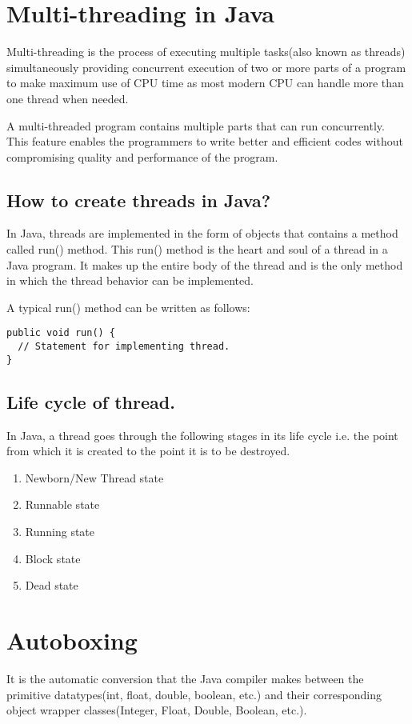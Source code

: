 \documentclass[a4paper, 12pt]{scrarticle}
\begin{document}
\section{Multi-threading in Java}
Multi-threading is the process of  executing multiple tasks(also known as threads) simultaneously providing concurrent execution of two or more parts of a program to make maximum use of CPU time as most modern CPU can handle more than one thread when needed.

A multi-threaded program contains multiple parts that can run concurrently. This feature enables the  programmers to write better and efficient codes without compromising quality and performance of the program.

\subsection{How to create threads  in Java?}
In Java, threads are implemented in the form of objects that contains a method called run() method. This run() method is the heart and soul of a thread in a Java program. It makes up the entire body of the thread and is the only method in which the thread behavior can be implemented.

A typical run() method can be written as follows:
\begin{verbatim}
public void run() {
  // Statement for implementing thread.
}
\end{verbatim}

\subsection{Life cycle of thread.}
In Java, a thread goes through the following stages in its life cycle i.e. the point from which it is created to the point it is to be destroyed.

\begin{enumerate}
  \item Newborn/New Thread state
  \item Runnable state
  \item Running state
  \item Block state
  \item Dead state
\end{enumerate}

\section{Autoboxing}
It is the automatic conversion that the Java compiler makes between the primitive datatypes(int, float, double, boolean, etc.) and their corresponding object wrapper classes(Integer, Float, Double, Boolean, etc.).
\end{document}
